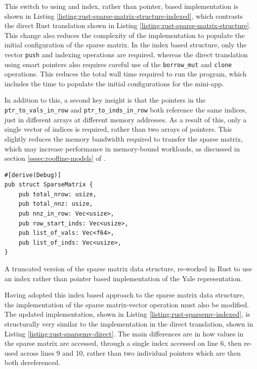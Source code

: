 This switch to using and index, rather than pointer, based implementation is shown in Listing \ref{listing:rust-sparse-matrix-structure-indexed}, which contrasts the direct Rust translation shown in Listing \ref{listing:rust-sparse-matrix-structure}. This change also reduces the complexity of the implementation to populate the initial configuration of the sparse matrix. In the index based structure, only the vector \texttt{push} and indexing operations are required, whereas the direct translation using smart pointers also requires careful use of the \texttt{borrow_mut} and \texttt{clone} operations. This reduces the total wall time required to run the program, which includes the time to populate the initial configurations for the mini-app.

In addition to this, a second key insight is that the pointers in the \texttt{ptr\_to\_vals\_in\_row} and \texttt{ptr\_to\_inds\_in\_row} both reference the same indices, just in different arrays at different memory addresses. As a result of this, only a single vector of indices is required, rather than two arrays of pointers. This slightly reduces the memory bandwidth required to transfer the sparse matrix, which may increase performance in memory-bound workloads, as discussed in section \ref{sssec:roofline-models} of .

\begin{listing}[H]
    \begin{verbatim}
#[derive(Debug)]
pub struct SparseMatrix {
    pub total_nrow: usize,
    pub total_nnz: usize,
    pub nnz_in_row: Vec<usize>,
    pub row_start_inds: Vec<usize>,
    pub list_of_vals: Vec<f64>,
    pub list_of_inds: Vec<usize>,
}
    \end{verbatim}
    \caption{A truncated version of the sparse matrix data structure, re-worked in Rust to use an index rather than pointer based implementation of the Yale representation.}
    \label{listing:rust-sparse-matrix-structure-indexed}
\end{listing}

Having adopted this index based approach to the sparse matrix data structure, the implementation of the sparse matrix-vector operation must also be modified. The updated implementation, shown in Listing \ref{listing:rust-sparsemv-indexed}, is structurally very similar to the implementation in the direct translation, shown in Listing \ref{listing:rust-sparsemv-direct}. The main differences are in how values in the sparse matrix are accessed, through a single index accessed on line 6, then re-used across lines 9 and 10, rather than two individual pointers which are then both dereferenced.


